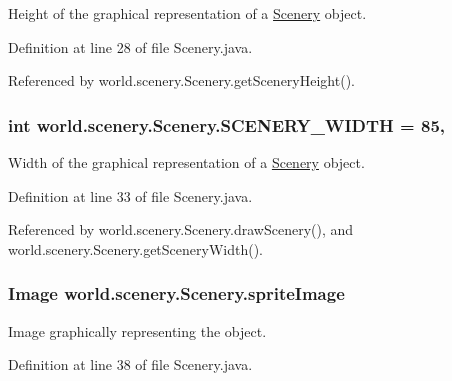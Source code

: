 Height of the graphical representation of a \hyperlink{a00024}{Scenery} object. 



Definition at line 28 of file Scenery.\-java.



Referenced by world.\-scenery.\-Scenery.\-get\-Scenery\-Height().

\hypertarget{a00024_affb047c028883c6d069a03ef0f1caeb8}{
\subsubsection[{S\-C\-E\-N\-E\-R\-Y\-\_\-\-W\-I\-D\-T\-H}]{\setlength{\rightskip}{0pt plus 5cm}int world.\-scenery.\-Scenery.\-S\-C\-E\-N\-E\-R\-Y\-\_\-\-W\-I\-D\-T\-H = 85\hspace{0.3cm}{\ttfamily [static]}, {\ttfamily [protected]}}}\label{a00024_affb047c028883c6d069a03ef0f1caeb8}


Width of the graphical representation of a \hyperlink{a00024}{Scenery} object. 



Definition at line 33 of file Scenery.\-java.



Referenced by world.\-scenery.\-Scenery.\-draw\-Scenery(), and world.\-scenery.\-Scenery.\-get\-Scenery\-Width().

\hypertarget{a00024_a512d9c0a154e6843389e343d80843326}{
\subsubsection[{sprite\-Image}]{\setlength{\rightskip}{0pt plus 5cm}Image world.\-scenery.\-Scenery.\-sprite\-Image\hspace{0.3cm}{\ttfamily [protected]}}}\label{a00024_a512d9c0a154e6843389e343d80843326}


Image graphically representing the object. 



Definition at line 38 of file Scenery.\-java.



